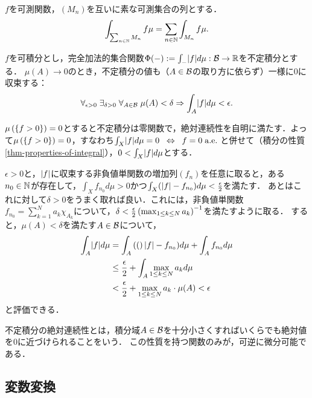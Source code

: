 \documentclass[uplatex, dvipdfmx]{jsreport}
\begin{document}
\begin{theorem}
    $f$を可測関数，$(M_n)$を互いに素な可測集合の列とする．
    \[\int_{\sum_{n\in\mathbb{N}}M_n}f\mu=\sum_{n\in\mathbb{N}}\int_{M_n}f\mu.\]
\end{theorem}

\begin{theorem}[不定積分は絶対連続な加法的集合関数である]\label{thm-indefinite-integral-is-absolutely-continuous}
    $f$を可積分とし，完全加法的集合関数$\Phi(-):=\int_{-}\lvert f\rvert d\mu:\mathcal{B}\to\mathbb{R}$を不定積分とする．
    $\mu(A)\to 0$のとき，不定積分の値も（$A\in\mathcal{B}$の取り方に依らず）一様に$0$に収束する：
    \[\forall_{\epsilon>0}\;\exists_{\delta>0}\;\forall_{A\in\mathcal{B}}\;\mu(A)<\delta\Rightarrow\int_A\lvert f\rvert d\mu<\epsilon.\]
\end{theorem}
\begin{Proof}
    $\mu\left(\left\{f>0\right\}\right)=0$とすると不定積分は零関数で，絶対連続性を自明に満たす．よって$\mu\left(\left\{f>0\right\}\right)=0$，すなわち$\int_X\lvert f\rvert d\mu=0\;\;\Leftrightarrow\;\; f=0\;\mathrm{a.e.}\;$と併せて（積分の性質\ref{thm-properties-of-integral}），$0<\int_X\lvert f\rvert d\mu$とする．

    $\epsilon>0$と，$\lvert f\rvert$に収束する非負値単関数の増加列$(f_n)$を任意に取ると，ある$n_0\in\mathbb{N}$が存在して，$\int_Xf_{n_0}d\mu>0$かつ$\int_X(\lvert f\rvert-f_{n_0})d\mu<\frac{\epsilon}{2}$を満たす．
    あとはこれに対して$\delta>0$をうまく取れば良い．これには，非負値単関数$f_{n_0}=\sum^N_{k=1}a_k\chi_{A_k}$について，$\delta<\frac{\epsilon}{2}\left(\max_{1\le k\le N}a_k\right)^{-1}$を満たすように取る．
    すると，$\mu(A)<\delta$を満たす$A\in\mathcal{B}$について，
    \begin{align*}
        \int_A\lvert f\rvert d\mu&=\int_A\left((\right)\lvert f\rvert-f_{n_0})d\mu+\int_Af_{n_0}d\mu\\
        &\le\frac{\epsilon}{2}+\int_A\max_{1\le k\le N}a_kd\mu\\
        &<\frac{\epsilon}{2}+\max_{1\le k\le N}a_k\cdot\mu(A)<\epsilon
    \end{align*}
    と評価できる．
\end{Proof}
\begin{remarks}
    不定積分の絶対連続性とは，積分域$A\in\mathcal{B}$を十分小さくすればいくらでも絶対値を$0$に近づけられることをいう．
    この性質を持つ関数のみが，可逆に微分可能である．
\end{remarks}

\subsection{変数変換}
\end{document}
